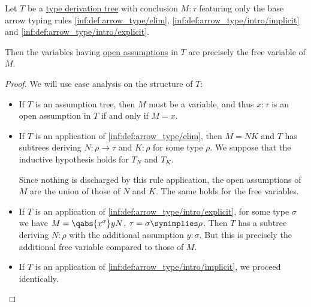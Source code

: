 \begin{proposition}\label{thm:assumptions_and_free_variables}
  Let \( T \) be a \hyperref[def:type_derivation_tree]{type derivation tree} with conclusion \( M: \tau \) featuring only the base arrow typing rules \ref{inf:def:arrow_type/elim}, \ref{inf:def:arrow_type/intro/implicit} and \ref{inf:def:arrow_type/intro/explicit}.

  Then the variables having \hyperref[def:type_derivation_tree/open_assumptions]{open assumptions} in \( T \) are precisely the free variable of \( M \).
\end{proposition}
\begin{proof}
  We will use case analysis on the structure of \( T \):
  \begin{itemize}
    \item If \( T \) is an assumption tree, then \( M \) must be a variable, and thus \( x: \tau \) is an open assumption in \( T \) if and only if \( M = x \).

    \item If \( T \) is an application of \ref{inf:def:arrow_type/elim}, then \( M = NK \) and \( T \) has subtrees deriving \( N: \rho \to \tau \) and \( K: \rho \) for some type \( \rho \). We suppose that the inductive hypothesis holds for \( T_N \) and \( T_K \).

    Since nothing is discharged by this rule application, the open assumptions of \( M \) are the union of those of \( N \) and \( K \). The same holds for the free variables.

    \item If \( T \) is an application of \ref{inf:def:arrow_type/intro/explicit}, for some type \( \sigma \) we have \( M = \qabs {x^\sigma} y N \), \( \tau = \sigma \synimplies \rho \). Then \( T \) has a subtree deriving \( N: \rho \) with the additional assumption \( y: \sigma \). But this is precisely the additional free variable compared to those of \( M \).

    \item If \( T \) is an application of \ref{inf:def:arrow_type/intro/implicit}, we proceed identically.
  \end{itemize}
\end{proof}

